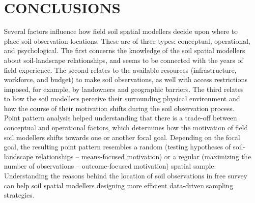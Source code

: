 \section{CONCLUSIONS}

Several factors influence how field soil spatial modellers decide upon where to place soil observation 
locations. These are of three types: conceptual, operational, and psychological. The first concerns the 
knowledge of the soil spatial modellers about soil-landscape relationships, and seems to be connected with the 
years of field experience. The second relates to the available resources (infrastructure, workforce, and 
budget) to make soil observations, as well with access restrictions imposed, for example, by landowners and 
geographic barriers. The third relates to how the soil modellers perceive their surrounding physical 
environment and how the course of their motivation shifts during the soil observation process. Point pattern 
analysis helped understanding that there is a trade-off between conceptual and operational factors, which 
determines how the motivation of field soil modellers shifts towards one or another focal goal. Depending on 
the focal goal, the resulting point pattern resembles a random (testing hypotheses of soil-landscape 
relationships -- means-focused motivation) or a regular (maximizing the number of observations -- 
outcome-focused motivation) spatial sample. Understanding the reasons behind the location of soil observations 
in free survey can help soil spatial modellers designing more efficient data-driven sampling strategies.

